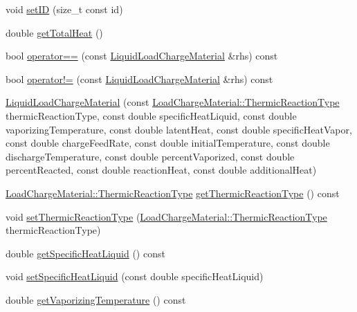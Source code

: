 \begin{DoxyCompactItemize}
\item 
void \hyperlink{class_liquid_load_charge_material_a3f6654f1d9387366e0ca7620ecc41361}{set\+ID} (size\+\_\+t const id)
\item 
double \hyperlink{class_liquid_load_charge_material_a51a9826325e2c34cd073b8766331d476}{get\+Total\+Heat} ()
\item 
bool \hyperlink{class_liquid_load_charge_material_ad2090d1628f26e46339e9e164b47d3a2}{operator==} (const \hyperlink{class_liquid_load_charge_material}{Liquid\+Load\+Charge\+Material} \&rhs) const
\item 
bool \hyperlink{class_liquid_load_charge_material_aa6ad825ee8ab1c7816ce3bf10260c0bb}{operator!=} (const \hyperlink{class_liquid_load_charge_material}{Liquid\+Load\+Charge\+Material} \&rhs) const
\item 
\hyperlink{class_liquid_load_charge_material_ab6b2ef342701227c60dc380f5a576085}{Liquid\+Load\+Charge\+Material} (const \hyperlink{class_load_charge_material_a51d4263e865a5d86236622dd3fe23fd1}{Load\+Charge\+Material\+::\+Thermic\+Reaction\+Type} thermic\+Reaction\+Type, const double specific\+Heat\+Liquid, const double vaporizing\+Temperature, const double latent\+Heat, const double specific\+Heat\+Vapor, const double charge\+Feed\+Rate, const double initial\+Temperature, const double discharge\+Temperature, const double percent\+Vaporized, const double percent\+Reacted, const double reaction\+Heat, const double additional\+Heat)
\item 
\hyperlink{class_load_charge_material_a51d4263e865a5d86236622dd3fe23fd1}{Load\+Charge\+Material\+::\+Thermic\+Reaction\+Type} \hyperlink{class_liquid_load_charge_material_a181337f5e5cf6a47b82dd56897b49c29}{get\+Thermic\+Reaction\+Type} () const
\item 
void \hyperlink{class_liquid_load_charge_material_a39c258d0bfdcfa352590d411a8c4e882}{set\+Thermic\+Reaction\+Type} (\hyperlink{class_load_charge_material_a51d4263e865a5d86236622dd3fe23fd1}{Load\+Charge\+Material\+::\+Thermic\+Reaction\+Type} thermic\+Reaction\+Type)
\item 
double \hyperlink{class_liquid_load_charge_material_aa698f1f73dff91951139a4a50582963d}{get\+Specific\+Heat\+Liquid} () const
\item 
void \hyperlink{class_liquid_load_charge_material_a2187c4c6ba394c05ab42e769bf175683}{set\+Specific\+Heat\+Liquid} (const double specific\+Heat\+Liquid)
\item 
double \hyperlink{class_liquid_load_charge_material_a07004e345fb4ff287d435d0c84027973}{get\+Vaporizing\+Temperature} () const

\end{DoxyCompactItemize}
